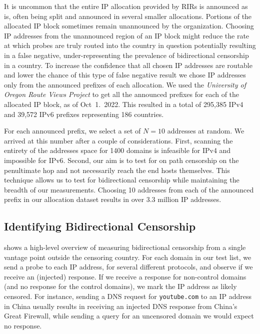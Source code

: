 It is uncommon that the entire IP allocation provided by RIRs is announced as
is, often being split and announced in several smaller allocations. Portions of
the allocated IP block sometimes remain unannounced by the organization.
Choosing IP addresses from the unannounced region of an IP block might reduce
the rate at which probes are truly routed into the country in question
potentially resulting in a false negative, under-representing the prevalence of
bidirectional censorship in a country. To increase the confidence that all
chosen IP addresses are routable and lower the chance of this type of false
negative result we chose IP addresses only from the announced prefixes of each
allocation. We used the \textit{University of Oregon Route Views Project}
\cite{RouteVie20:online} to get all the announced prefixes for each of the
allocated IP block, as of Oct~1.~2022. This resulted
in a total of 295,385 IPv4 and 39,572 IPv6 prefixes representing 186 countries.


For each announced prefix, we select a set of $N=10$ addresses at random. We
arrived at this number after a couple of considerations. First, scanning the
entirety of the addresses space for 1400 domains is infeasible for IPv4 and
impossible for IPv6. Second, our aim is to test for on path censorship on the
penultimate hop and not necessarily reach the end hosts themselves. This
technique allows us to test for bidirectional censorship while maintaining the
breadth of our measurements. Choosing 10 addresses from each of the announced
prefix in our allocation dataset results in over 3.3 million IP addresses.

\subsection{Identifying Bidirectional Censorship}
\label{sec:methodology:censorship}


\textbf{} shows a high-level overview of measuring
bidirectional censorship from a single vantage point outside the censoring
country. For each domain in our test list, we send a probe to each IP address,
for several different protocols, and observe if we receive an (injected)
response. If we receive a response for non-control domains (and no response for
the control domains), we mark the IP address as likely censored. For instance,
sending a DNS request for \texttt{youtube.com} to an IP address in China usually
results in receiving an injected DNS response from China's Great Firewall, while
sending a query for an uncensored domain we would expect no response.

